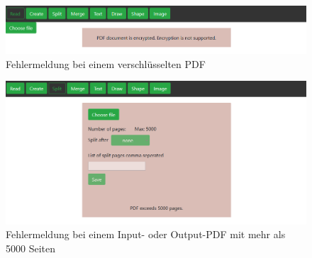 \begin{figure}[!htbp]
	\centering
	\includegraphics[width=1\textwidth]{"images/errorcrypt.png"}
	\caption{Fehlermeldung bei einem verschlüsselten PDF}
	\label{fig:errorcrypt}
\end{figure}

\begin{figure}[!htbp]
	\centering
	\includegraphics[width=1\textwidth]{"images/errorpages.png"}
	\caption{Fehlermeldung bei einem Input- oder Output-PDF mit mehr als 5000 Seiten}
	\label{fig:errorpages}
\end{figure}

